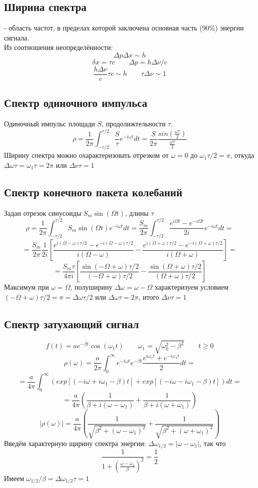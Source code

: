 \documentclass{article}
\begin{document}
\subsection{Ширина спектра}
- область частот, в пределах которой заключена основная часть (90\%) энергии сигнала. \\
Из соотношения неопределённости:
\[\Delta p\Delta x\sim h\]
\[\delta x = \tau c \qquad \Delta p = h\Delta \nu/c\]
\[\frac{h \Delta \nu}{c}\tau c \sim h \qquad \tau \Delta \nu \sim 1\]
\subsection{Спектр одиночного импульса}
Одиночный импульс площади $S$, продолижтельности $\tau$.
\[\rho=\frac{1}{2\pi}\int_{-\tau/2}^{\tau/2}\frac{S}{\tau}e^{-i\omega t}dt=\frac{S}{2\pi}\frac{sin(\frac{\omega \tau}{2})}{\frac{\omega \tau}{2}}\]
Ширину спектра можно охарактеризовать отрезком от $\omega=0$ до $\omega_1\tau/2=\pi$, откуда $\Delta \omega \tau=\omega_1\tau=2\pi$ или $\Delta\nu \tau =1$
\subsection{Спектр конечного пакета колебаний}
Задан отрезок синусоиды $S_m\sin(\Omega t)$, длины $\tau$
\[\rho=\frac{1}{2\pi}\int_{-\tau/2}^{\tau/2}S_m\sin(\Omega t)e^{-i\omega t}dt=\frac{S_m}{2\pi}\int_{-\tau/2}^{\tau/2}\frac{e^{i\Omega t}-e^{-i\Omega t}}{2i}e^{-i\omega t}dt=\]
\[=\frac{S_m}{2\pi}\frac{1}{2i}[\frac{e^{i(\Omega-\omega)\tau/2}-e^{-i(\Omega-\omega)\tau/2}}{i(\Omega-\omega)}-\frac{e^{i(\Omega+\omega)\tau/2}-e^{-i(\Omega+\omega)\tau/2}}{i(\Omega+\omega)}]=\]
\[=\frac{S_m\tau}{4\pi i}[\frac{\sin(-\Omega+\omega)\tau/2}{(-\Omega+\omega)\tau/2}-\frac{\sin(\Omega+\omega)\tau/2}{(\Omega+\omega)\tau/2}]\]
Максимум при $\omega=\Omega$, полуширину $\Delta\omega=\omega-\Omega$ характеризуем условием $(-\Omega+\omega)\tau/2=\pi=\Delta\omega\tau/2$ или $\Delta \omega \tau = 2 \pi$, итого $\Delta \nu \tau = 1$
\subsection{Спектр затухающий сигнал}
\[f(t)=ae^{-\beta t}\cos(\omega_1 t) \qquad \omega_1=\sqrt{\omega_0^2-\beta^2} \qquad t \ge 0\]
\[\rho(\omega)=\frac{a}{2\pi}\int_{0}^{\infty}e^{-i\omega t}e^{-\beta t}\frac{e^{i\omega_1 t}+e^{-i\omega_1 t}}{2}dt=\]
\[=\frac{a}{4\pi}\int_{0}^{\infty}(exp[(-i\omega+i\omega_1 - \beta)t]+exp[(-i\omega-i\omega_1 - \beta)t])dt=\]
\[=\frac{a}{4\pi}(\frac{1}{\beta+i(\omega-\omega_1)}+\frac{1}{\beta+i(\omega+\omega_1)})\]
\[|\rho(\omega)|=\frac{a}{4\pi}(\frac{1}{\sqrt{\beta^2+(\omega-\omega_1)^2}}+\frac{1}{\sqrt{\beta^2+(\omega+\omega_1)^2}})\]
Введём характерную щирину спектра энергии: $\Delta \omega_{1/2}=|\omega-\omega_1|$, так что
\[\frac{1}{1+(\frac{\omega-\omega_1}{\beta})^2}=\frac{1}{2}\]
Имеем $\omega_{1/2}/\beta=\Delta\omega_{1/2}\tau=1$
\end{document}
